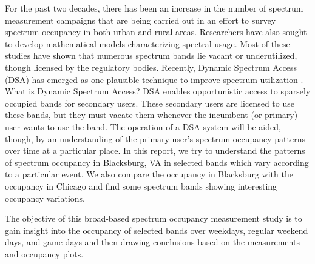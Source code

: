 \documentclass[12pt,sts]{report}
\begin{document}
For the past two decades, there has been an increase in the number of spectrum measurement campaigns that are being carried out in an effort to survey spectrum occupancy in both urban and rural areas. Researchers have also sought to develop mathematical models characterizing spectral usage. Most of these studies have shown that numerous spectrum bands lie vacant or underutilized, though licensed by the regulatory bodies. Recently, Dynamic Spectrum Access (DSA) has emerged as one plausible technique to improve spectrum utilization \cite{IEEEexample:Akyildiz06nextgeneration}. What is Dynamic Spectrum Access? DSA enables opportunistic access to sparsely occupied bands for secondary users. These secondary users are licensed to use these bands, but they must vacate them whenever the incumbent (or primary) user wants to use the band. The operation of a DSA system will be aided, though, by an understanding of the primary user's spectrum occupancy patterns over time at a particular place. In this report, we try to understand the patterns of spectrum occupancy in Blacksburg, VA in selected bands which vary according to a particular event. We also compare the occupancy in Blacksburg with the occupancy in Chicago and find some spectrum bands showing interesting occupancy variations.

	The objective of this broad-based spectrum occupancy measurement study is to gain insight into the occupancy of selected bands over weekdays, regular weekend days, and game days and then drawing conclusions based on the measurements and occupancy plots.
	
\end{document}
